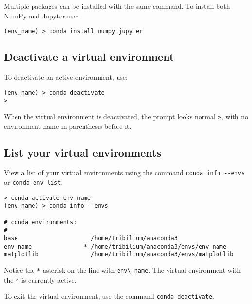 \documentclass{book}
\newcommand{\passthrough}[1]{#1}
\begin{document}
Multiple packages can be installed with the same command. To install
both NumPy and Jupyter use:

\begin{lstlisting}
(env_name) > conda install numpy jupyter
\end{lstlisting}
    




    
        \hypertarget{deactivate-a-virtual-environment}{%
\subsection{Deactivate a virtual
environment}\label{deactivate-a-virtual-environment}}

To deactivate an active environment, use:

\begin{lstlisting}
(env_name) > conda deactivate
>
\end{lstlisting}

When the virtual environment is deactivated, the prompt looks normal
\passthrough{\lstinline!>!}, with no environment name in parenthesis
before it.
    




    
        \hypertarget{list-your-virtual-environments}{%
\subsection{List your virtual
environments}\label{list-your-virtual-environments}}

View a list of your virtual environments using the command
\passthrough{\lstinline!conda info --envs!} or
\passthrough{\lstinline!conda env list!}.

\begin{lstlisting}
> conda activate env_name
(env_name) > conda info --envs

# conda environments:
#
base                     /home/tribilium/anaconda3
env_name               * /home/tribilium/anaconda3/envs/env_name
matplotlib               /home/tribilium/anaconda3/envs/matplotlib
\end{lstlisting}

Notice the \passthrough{\lstinline!*!} asterisk on the line with
\passthrough{\lstinline!env\_name!}. The virtual environment with the
\passthrough{\lstinline!*!} is currently active.

To exit the virtual environment, use the command
\passthrough{\lstinline!conda deactivate!}.
\end{document}
